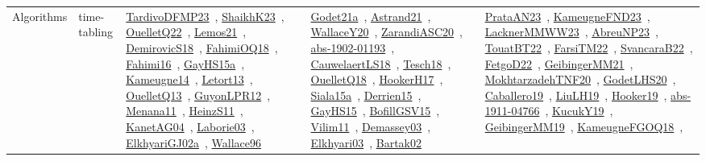 {\begin{longtable}{lp{3cm}>{\raggedright\arraybackslash}p{6cm}>{\raggedright\arraybackslash}p{6cm}>{\raggedright\arraybackslash}p{8cm}}
Algorithms & time-tabling & \href{works/TardivoDFMP23.pdf}{TardivoDFMP23}~\cite{TardivoDFMP23}, \href{works/ShaikhK23.pdf}{ShaikhK23}~\cite{ShaikhK23}, \href{works/OuelletQ22.pdf}{OuelletQ22}~\cite{OuelletQ22}, \href{works/Lemos21.pdf}{Lemos21}~\cite{Lemos21}, \href{works/DemirovicS18.pdf}{DemirovicS18}~\cite{DemirovicS18}, \href{works/FahimiOQ18.pdf}{FahimiOQ18}~\cite{FahimiOQ18}, \href{works/Fahimi16.pdf}{Fahimi16}~\cite{Fahimi16}, \href{works/GayHS15a.pdf}{GayHS15a}~\cite{GayHS15a}, \href{works/Kameugne14.pdf}{Kameugne14}~\cite{Kameugne14}, \href{works/Letort13.pdf}{Letort13}~\cite{Letort13}, \href{works/OuelletQ13.pdf}{OuelletQ13}~\cite{OuelletQ13}, \href{works/GuyonLPR12.pdf}{GuyonLPR12}~\cite{GuyonLPR12}, \href{works/Menana11.pdf}{Menana11}~\cite{Menana11}, \href{works/HeinzS11.pdf}{HeinzS11}~\cite{HeinzS11}, \href{works/KanetAG04.pdf}{KanetAG04}~\cite{KanetAG04}, \href{works/Laborie03.pdf}{Laborie03}~\cite{Laborie03}, \href{works/ElkhyariGJ02a.pdf}{ElkhyariGJ02a}~\cite{ElkhyariGJ02a}, \href{works/Wallace96.pdf}{Wallace96}~\cite{Wallace96} & \href{works/Godet21a.pdf}{Godet21a}~\cite{Godet21a}, \href{works/Astrand21.pdf}{Astrand21}~\cite{Astrand21}, \href{works/WallaceY20.pdf}{WallaceY20}~\cite{WallaceY20}, \href{works/ZarandiASC20.pdf}{ZarandiASC20}~\cite{ZarandiASC20}, \href{works/abs-1902-01193.pdf}{abs-1902-01193}~\cite{abs-1902-01193}, \href{works/CauwelaertLS18.pdf}{CauwelaertLS18}~\cite{CauwelaertLS18}, \href{works/Tesch18.pdf}{Tesch18}~\cite{Tesch18}, \href{works/OuelletQ18.pdf}{OuelletQ18}~\cite{OuelletQ18}, \href{works/HookerH17.pdf}{HookerH17}~\cite{HookerH17}, \href{works/Siala15a.pdf}{Siala15a}~\cite{Siala15a}, \href{works/Derrien15.pdf}{Derrien15}~\cite{Derrien15}, \href{works/GayHS15.pdf}{GayHS15}~\cite{GayHS15}, \href{works/BofillGSV15.pdf}{BofillGSV15}~\cite{BofillGSV15}, \href{works/Vilim11.pdf}{Vilim11}~\cite{Vilim11}, \href{works/Demassey03.pdf}{Demassey03}~\cite{Demassey03}, \href{works/Elkhyari03.pdf}{Elkhyari03}~\cite{Elkhyari03}, \href{works/Bartak02.pdf}{Bartak02}~\cite{Bartak02} & \href{works/PrataAN23.pdf}{PrataAN23}~\cite{PrataAN23}, \href{works/KameugneFND23.pdf}{KameugneFND23}~\cite{KameugneFND23}, \href{works/LacknerMMWW23.pdf}{LacknerMMWW23}~\cite{LacknerMMWW23}, \href{works/AbreuNP23.pdf}{AbreuNP23}~\cite{AbreuNP23}, \href{works/TouatBT22.pdf}{TouatBT22}~\cite{TouatBT22}, \href{works/FarsiTM22.pdf}{FarsiTM22}~\cite{FarsiTM22}, \href{works/SvancaraB22.pdf}{SvancaraB22}~\cite{SvancaraB22}, \href{works/FetgoD22.pdf}{FetgoD22}~\cite{FetgoD22}, \href{works/GeibingerMM21.pdf}{GeibingerMM21}~\cite{GeibingerMM21}, \href{works/MokhtarzadehTNF20.pdf}{MokhtarzadehTNF20}~\cite{MokhtarzadehTNF20}, \href{works/GodetLHS20.pdf}{GodetLHS20}~\cite{GodetLHS20}, \href{works/Caballero19.pdf}{Caballero19}~\cite{Caballero19}, \href{works/LiuLH19.pdf}{LiuLH19}~\cite{LiuLH19}, \href{works/Hooker19.pdf}{Hooker19}~\cite{Hooker19}, \href{works/abs-1911-04766.pdf}{abs-1911-04766}~\cite{abs-1911-04766}, \href{works/KucukY19.pdf}{KucukY19}~\cite{KucukY19}, \href{works/GeibingerMM19.pdf}{GeibingerMM19}~\cite{GeibingerMM19}, \href{works/KameugneFGOQ18.pdf}{KameugneFGOQ18}~\cite{KameugneFGOQ18}, 
\end{longtable}}
